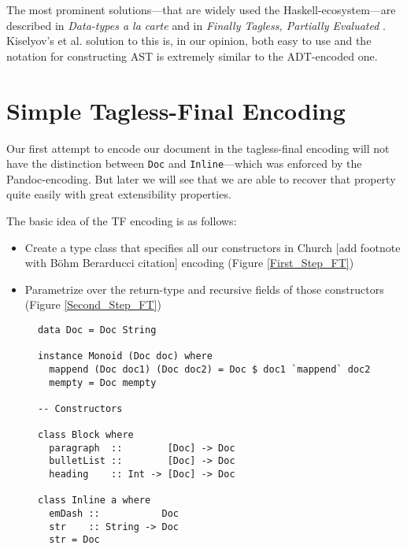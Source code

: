 The most prominent solutions—that are widely used the Haskell-ecosystem—are
described in \emph{Data-types a la carte} \cite{data-types-a-la-carte} and in
\emph{Finally Tagless, Partially Evaluated} \cite{finally-tagless}. Kiselyov’s
et al. solution to this is, in our opinion, both easy to use and the notation
for constructing AST is extremely similar to the ADT-encoded one.


\section{Simple Tagless-Final Encoding}

Our first attempt to encode our document in the tagless-final encoding will not
have the distinction between \texttt{Doc} and \texttt{Inline}—which was enforced
by the Pandoc-encoding. But later we will see that we are able to recover that
property quite easily with great extensibility properties.

The basic idea of the TF encoding is as follows:

\begin{itemize}
\item Create a type class that specifies all our constructors in Church [add
  footnote with Böhm Berarducci citation] encoding (Figure \ref{First_Step_FT})
\item Parametrize over the return-type and recursive fields of those
  constructors (Figure \ref{Second_Step_FT})
\end{itemize}

\begin{figure}
\begin{lstlisting}
data Doc = Doc String

instance Monoid (Doc doc) where
  mappend (Doc doc1) (Doc doc2) = Doc $ doc1 `mappend` doc2
  mempty = Doc mempty

-- Constructors

class Block where
  paragraph  ::        [Doc] -> Doc
  bulletList ::        [Doc] -> Doc
  heading    :: Int -> [Doc] -> Doc

class Inline a where
  emDash ::           Doc
  str    :: String -> Doc
  str = Doc
\end{lstlisting}
\end{figure}

